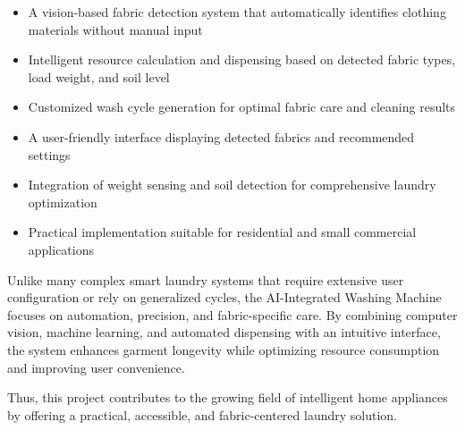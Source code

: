 \begin{itemize}
    \item A vision-based fabric detection system that automatically identifies clothing materials without manual input
    \item Intelligent resource calculation and dispensing based on detected fabric types, load weight, and soil level
    \item Customized wash cycle generation for optimal fabric care and cleaning results
    \item A user-friendly interface displaying detected fabrics and recommended settings
    \item Integration of weight sensing and soil detection for comprehensive laundry optimization
    \item Practical implementation suitable for residential and small commercial applications
\end{itemize}

\noindent
Unlike many complex smart laundry systems that require extensive user configuration or rely on generalized cycles, the AI-Integrated Washing Machine focuses on automation, precision, and fabric-specific care. By combining computer vision, machine learning, and automated dispensing with an intuitive interface, the system enhances garment longevity while optimizing resource consumption and improving user convenience.

\noindent
Thus, this project contributes to the growing field of intelligent home appliances by offering a practical, accessible, and fabric-centered laundry solution.